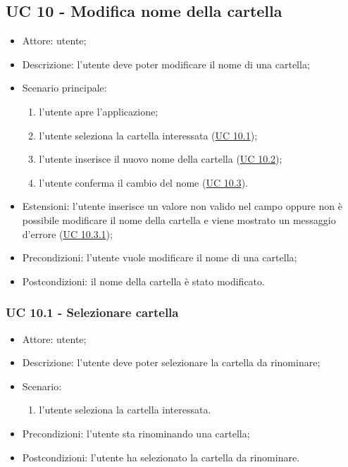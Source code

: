     \subsection{UC 10 - Modifica nome della cartella}
    \begin{itemize}
        \item Attore: utente;
        \item Descrizione: l'utente deve poter modificare il nome di una cartella;
        \item Scenario principale:
            \begin{enumerate}
            \item l’utente apre l'applicazione;
            \item l’utente seleziona la cartella interessata (\hyperref[sec: UC 10.1]{UC 10.1});
            \item l'utente inserisce il nuovo nome della cartella (\hyperref[sec: UC 10.2]{UC 10.2});
            \item l'utente conferma il cambio del nome (\hyperref[sec: UC 10.3]{UC 10.3}).
            \end{enumerate}
        \item Estensioni: l'utente inserisce un valore non valido nel campo oppure non è possibile modificare il nome della cartella e viene mostrato un messaggio d'errore (\hyperref[sec: UC 10.3.1]{UC 10.3.1});
        \item Precondizioni: l'utente vuole modificare il nome di una cartella;
        \item Postcondizioni: il nome della cartella è stato modificato.
    \end{itemize}
    \subsubsection{UC 10.1 - Selezionare cartella} \label{sec: UC 10.1}
    \begin{itemize}
        \item Attore: utente;
        \item Descrizione: l'utente deve poter selezionare la cartella da rinominare;
        \item Scenario:
        \begin{enumerate}
        \item l'utente seleziona la cartella interessata.
        \end{enumerate}
        \item Precondizioni: l'utente sta rinominando una cartella;
        \item Postcondizioni: l'utente ha selezionato la cartella da rinominare.
    \end{itemize}

